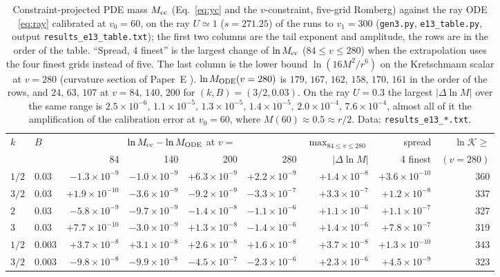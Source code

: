 \documentclass[11pt]{article}
\begin{document}
\begin{table}[t]
\centering\footnotesize\setlength{\tabcolsep}{3pt}
\begin{tabular}{llrrrrrrr}
\toprule
$k$ & $B$ & \multicolumn{4}{c}{$\ln M_{\rm cc}-\ln M_{\rm ODE}$ at $v=$} & $\max_{84\le v\le280}$ & spread & $\ln\mathcal K\ge$\\
 & & 84 & 140 & 200 & 280 & $|\Delta\ln M|$ & 4 finest & $(v=280)$\\
\midrule
$1/2$ & 0.03 & $-1.3\times10^{-9}$ & $-1.0\times10^{-9}$ & $+6.3\times10^{-9}$ & $+2.2\times10^{-9}$ & $+1.4\times10^{-8}$ & $+3.6\times10^{-10}$ & 360\\
$3/2$ & 0.03 & $+1.9\times10^{-10}$ & $-3.6\times10^{-9}$ & $-9.2\times10^{-9}$ & $-3.3\times10^{-7}$ & $+3.3\times10^{-7}$ & $+1.2\times10^{-8}$ & 337\\
$2$ & 0.03 & $-5.8\times10^{-9}$ & $-9.7\times10^{-9}$ & $-1.4\times10^{-8}$ & $-1.1\times10^{-6}$ & $+1.1\times10^{-6}$ & $+1.1\times10^{-7}$ & 327\\
$3$ & 0.03 & $+7.7\times10^{-10}$ & $-3.0\times10^{-9}$ & $+1.3\times10^{-8}$ & $-1.4\times10^{-6}$ & $+1.4\times10^{-6}$ & $+7.8\times10^{-7}$ & 319\\
$1/2$ & 0.003 & $+3.7\times10^{-8}$ & $+3.1\times10^{-8}$ & $+2.6\times10^{-8}$ & $+1.6\times10^{-8}$ & $+3.7\times10^{-8}$ & $+1.3\times10^{-10}$ & 343\\
$3/2$ & 0.003 & $-9.8\times10^{-8}$ & $-9.9\times10^{-8}$ & $-4.5\times10^{-7}$ & $-2.3\times10^{-6}$ & $+2.3\times10^{-6}$ & $+4.5\times10^{-9}$ & 323\\
\bottomrule
\end{tabular}
\caption{Constraint-projected PDE mass $M_{\rm cc}$ (Eq.~\eqref{eq:yc} and the $v$-constraint, five-grid Romberg) against the ray ODE \eqref{eq:ray} calibrated at $v_0=60$, on the ray $U\simeq1$ ($s=271.25$) of the runs to $v_1=300$ (\texttt{gen3.py}, \texttt{e13\_table.py}, output \texttt{results\_e13\_table.txt}); the first two columns are the tail exponent and amplitude, the rows are in the order of the table. ``Spread, 4 finest'' is the largest change of $\ln M_{\rm cc}$ ($84\le v\le280$) when the extrapolation uses the four finest grids instead of five. The last column is the lower bound $\ln(16M^2/r^6)$ on the Kretschmann scalar at $v=280$ (curvature section of Paper~E \citep{PaperE}). $\ln M_{\rm ODE}(v=280)$ is $179,\,167,\,162,\,158,\,170,\,161$ in the order of the rows, and $24,\,63,\,107$ at $v=84,\,140,\,200$ for $(k,B)=(3/2,0.03)$. On the ray $U=0.3$ the largest $|\Delta\ln M|$ over the same range is $2.5\times10^{-6},\,1.1\times10^{-5},\,1.3\times10^{-5},\,1.4\times10^{-5},\,2.0\times10^{-4},\,7.6\times10^{-4}$, almost all of it the amplification of the calibration error at $v_0=60$, where $M(60)\approx0.5\approx r/2$. Data: \texttt{results\_e13\_*.txt}.}
\label{tab:proj}
\end{table}
\end{document}
